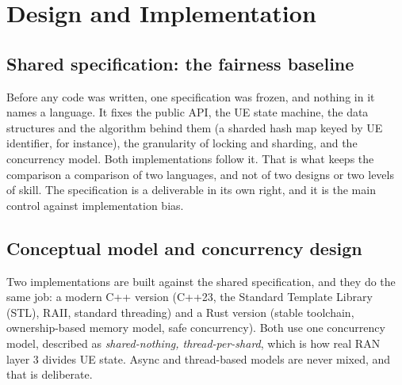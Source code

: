 \documentclass[english,oneside,a4paper,censored,csm,software-track-2020]{HYthesisML}
\begin{document}
\chapter{Design and Implementation\label{chapter:design}}

\section{Shared specification: the fairness baseline}
\label{sec:fairness}
Before any code was written, one specification was frozen, and nothing in it names a language.
It fixes the public API, the UE state machine, the data structures and the algorithm behind them
(a sharded hash map keyed by UE identifier, for instance), the granularity of locking and
sharding, and the concurrency model. Both implementations follow it. That is what keeps the
comparison a comparison of two languages, and not of two designs or two levels of skill. The
specification is a deliverable in its own right, and it is the main control against
implementation bias.

\section{Conceptual model and concurrency design}\label{sec:concurrency}
Two implementations are built against the shared specification, and they do the same job: a
modern C++ version (C++23, the Standard Template Library (STL), RAII, standard threading) and a
Rust version (stable toolchain,
ownership-based memory model, safe concurrency). Both use one concurrency model, described as
\emph{shared-nothing, thread-per-shard}, which is how real RAN layer 3 divides UE state. Async and
thread-based models are never mixed, and that is deliberate.
\end{document}

